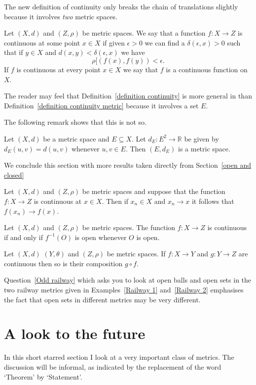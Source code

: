 The new definition of continuity only breaks the chain
of translations slightly because it involves 
\emph{two} metric spaces.
\begin{definition}\label{definition continuity metric}
Let $(X,d)$ and $(Z,\rho)$ be metric spaces.
We say that a function $f:X \rightarrow Z$
is continuous at some point $x\in X$
if given $\epsilon>0$ we can find a 
$\delta(\epsilon,x)>0$ such that
if $y\in X$ and
$d(x,y)<\delta(\epsilon,x)$
we have 
\[\rho[(f(x),f(y))<\epsilon.\]
If $f$ is continuous at every point $x\in X$
we say that $f$ is a continuous function on $X$.
\end{definition}
The reader may feel that 
Definition~\ref{definition continuity} is more general 
in than Definition~\ref{definition continuity metric}
because it involves a set $E$.

The following remark shows that this is not so.
\begin{lemma}\label{restriction metric}
Let $(X,d)$ be a metric space and $E\subseteq X$.
Let $d_{E}:E^{2}\rightarrow{\mathbb R}$ be given
by $d_{E}(u,v)=d(u,v)$ whenever $u,v\in E$. Then
$(E,d_{E})$ is a metric space.
\end{lemma}

We conclude this section with more results
taken directly from Section~\ref{open and closed}
\begin{lemma} Let $(X,d)$ and $(Z,\rho)$
be metric spaces
and suppose that the function $f:X\rightarrow Z$
is continuous at $x\in X$. Then if 
$x_{n}\in X$ and $x_{n}\rightarrow x$
it follows that $f(x_{n})\rightarrow f(x)$.
\end{lemma}
\begin{lemma}\label{continuous open metric}
Let $(X,d)$ and $(Z,\rho)$
be metric spaces. 
The function $f:X\rightarrow Z$
is continuous if and only if $f^{-1}(O)$ is open
whenever $O$ is open.
\end{lemma}
\begin{lemma} Let $(X,d)$ $(Y,\theta)$
and $(Z,\rho)$ be metric spaces.
If $f:X\rightarrow Y$
and $g:Y\rightarrow Z$
are continuous then so is their composition 
$g\circ f$.
\end{lemma}

Question~\ref{Odd railway} which asks you to look at
open balls and open sets in the  two railway metrics
given in
Examples~\ref{Railway 1} and~\ref{Railway 2}
emphasises the fact that open sets in different metrics
may be very different.

\section{A look to the future} In this short starred
section I look at a very important class of metrics.
The discussion will be informal, as indicated by the
replacement of the word `Theorem' by `Statement'.

